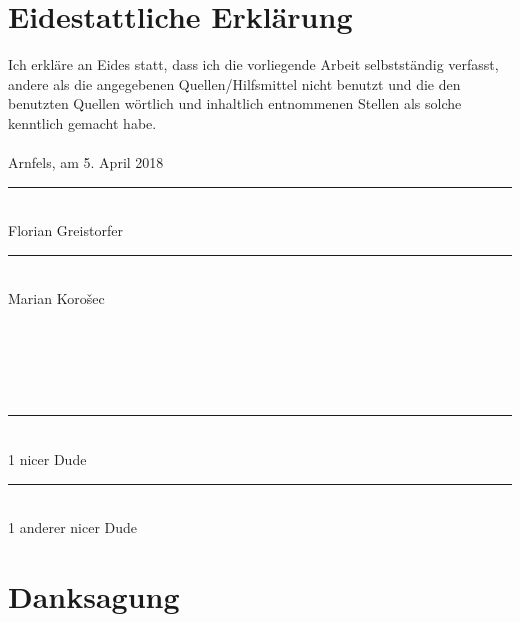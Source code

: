 \frontmatter												%
\addtocounter{page}{2}

\rehead{}
\ohead[\pagemark]{\pagemark}

\newcommand{\doublesignature}[1]{%
  \parbox{\textwidth}{
    \hfill
    \parbox{7cm}{
      \centering
      \rule{6cm}{1pt}\\
      Florian Greistorfer
    }
    \parbox{7cm}{
      \centering
      \rule{6cm}{1pt}\\
      Marian Korošec
    }
  }
}
\newcommand{\doublesign}[1]{%
\mbox{}\\
\mbox{}\\
\mbox{}\\
\mbox{}\\
  \parbox{\textwidth}{
    \hfill
    \parbox{7cm}{
      \centering
      \rule{6cm}{1pt}\\
      1 nicer Dude
    }
    \parbox{7cm}{
      \centering
      \rule{6cm}{1pt}\\
      1 anderer nicer Dude
    }
  }
}

\vspace*{20pt}

\section*{Eidestattliche Erklärung}
\label{sec:eidestattliche-erklaerung}
Ich erkläre an Eides statt, dass ich die vorliegende Arbeit selbstständig verfasst, andere als die angegebenen
Quellen/Hilfsmittel nicht benutzt und die den benutzten Quellen wörtlich und inhaltlich entnommenen
Stellen als solche kenntlich gemacht habe.\\
\\
Arnfels, am 5. April 2018\\

\vskip 1cm

\doublesignature{}
\doublesign{}

\vskip 5cm

\clearpage

\newpage
\thispagestyle{empty}
\mbox{}

\clearpage

\section*{Danksagung}
\label{sec:danksagung}

\clearpage

\newpage
\thispagestyle{empty}
\mbox{}

